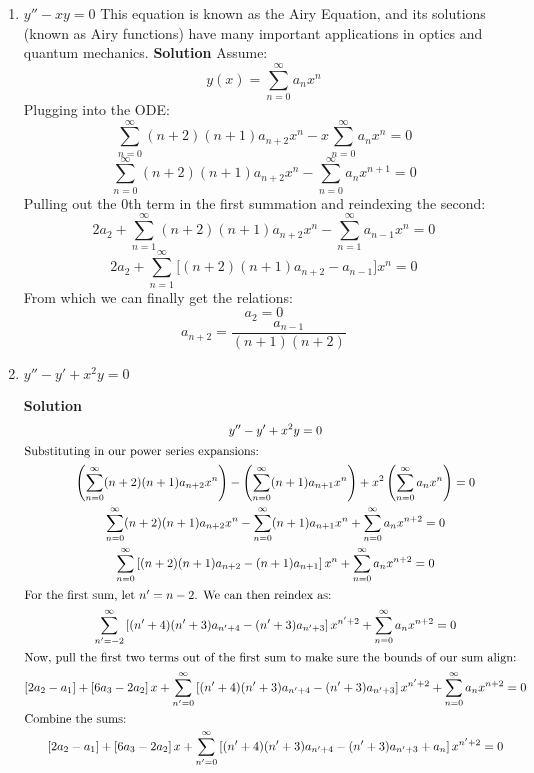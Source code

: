 \documentclass[letterpaper, fontsize=11pt]{scrartcl} %
\numberwithin{equation}{section} %
\numberwithin{figure}{section} %
\numberwithin{table}{section} %
\begin{document}
\begin{enumerate}
\begin{enumerate}
\item $y'' - xy = 0$ \newline
This equation is known as the Airy Equation, and its solutions (known as Airy functions) have many important applications in optics and quantum mechanics. \newline
\textbf{Solution} \newline Assume:
$$ y(x) =  \sum\limits_{n=0}^\infty a_n x^n$$
Plugging into the ODE:
$$ \sum\limits_{n=0}^\infty (n+2)(n+1)a_{n+2} x^n - x\sum\limits_{n=0}^\infty a_n x^{n} = 0$$
$$ \sum\limits_{n=0}^\infty (n+2)(n+1)a_{n+2} x^n - \sum\limits_{n=0}^\infty a_n x^{n+1} = 0$$
Pulling out the 0th term in the first summation and reindexing the second:
$$ 2a_2 + \sum\limits_{n=1}^\infty (n+2)(n+1)a_{n+2}x^n - \sum\limits_{n=1}^\infty a_{n-1} x^{n} = 0$$
$$ 2a_2 + \sum\limits_{n=1}^\infty \big [(n+2)(n+1)a_{n+2} - a_{n-1} \big] x^{n} = 0$$
From which we can finally get the relations:
$$a_2 = 0$$
$$a_{n+2} = \frac{a_{n-1}}{(n+1)(n+2)}$$

\item $y'' - y' + x^2y = 0$
\par \textbf{Solution}
\begin{gather*}
y''- y' +  x^2 y   = 0\\
\intertext{Substituting in our power series expansions:}
\left(\sum\limits_{n=0}^\infty (n+2)(n+1)a_{n+2} x^n\right) - \left(\sum\limits_{n=0}^\infty (n+1) a_{n+1} x^n \right) 
+ x^2 \left( \sum\limits_{n=0}^\infty a_n x^n \right) = 0\\
\sum\limits_{n=0}^\infty (n+2)(n+1)a_{n+2} x^n - \sum\limits_{n=0}^\infty (n+1) a_{n+1} x^n + \sum\limits_{n=0}^\infty a_n x^{n+2} = 0\\
\sum\limits_{n=0}^\infty \left[(n+2)(n+1)a_{n+2} - (n+1) a_{n+1} \right] x^n + \sum\limits_{n=0}^\infty a_n x^{n+2} = 0\\
\intertext{For the first sum, let $n' = n - 2$. We can then reindex as:}
\sum\limits_{n'=-2}^\infty \left[(n'+4)(n'+3)a_{n'+4} - (n'+3) a_{n'+3} \right] x^{n'+2} + \sum\limits_{n=0}^\infty a_n x^{n+2} = 0\\
\intertext{Now, pull the first two terms out of the first sum to make sure the bounds of our sum align:}
\left[2a_{2} - a_{1} \right] + \left[6a_{3} - 2 a_{2} \right] x
+ \sum\limits_{n'=0}^\infty \left[(n'+4)(n'+3)a_{n'+4} - (n'+3) a_{n'+3} \right] x^{n'+2} + \sum\limits_{n=0}^\infty a_n x^{n+2} = 0\\
\intertext{Combine the sums:}
\left[2a_{2} - a_{1} \right] + \left[6a_{3} - 2 a_{2} \right] x
+ \sum\limits_{n'=0}^\infty \left[(n'+4)(n'+3)a_{n'+4} - (n'+3) a_{n'+3}  +  a_n \right] x^{n'+2} = 0\\
\end{gather*}


\end{enumerate}
\end{enumerate}
\end{document}
